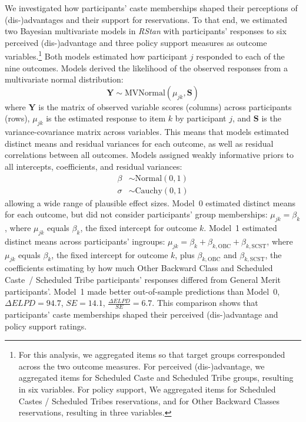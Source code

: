 \documentclass[12pt, a4paper]{article}
\begin{document}
We investigated how participants' caste memberships shaped their perceptions of (dis-)advantages and their support for reservations. To that end, we estimated two Bayesian multivariate models in \emph{RStan} \cite{rstan_package} with participants' responses to six perceived (dis-)advantage and three policy support measures as outcome variables.\footnote{For this analysis, we aggregated items so that target groups corresponded across the two outcome measures. For perceived (dis-)advantage, we aggregated items for Scheduled Caste and Scheduled Tribe groups, resulting in six variables. For policy support, We aggregated items for Scheduled Castes / Scheduled Tribes reservations, and for Other Backward Classes reservations, resulting in three variables.} Both models estimated how participant $j$ responded to each of the nine outcomes. Models derived the likelihood of the observed responses from a multivariate normal distribution: $$ \textbf{Y} \sim \text{MVNormal} (\mu_{jk}, \textbf{S} ) $$ where $\textbf{Y}$ is the matrix of observed variable scores (columns) across participants (rows), $\mu_{jk}$ is the estimated response to item $k$ by participant $j$, and $\textbf{S}$ is the variance-covariance matrix across variables. This means that models estimated distinct means and residual variances for each outcome, as well as residual correlations between all outcomes. Models assigned weakly informative priors to all intercepts, coefficients, and residual variances: 
\begin{align*} 
\beta & \sim \text{Normal} (0, 1) \\ 
\sigma & \sim \text{Cauchy} (0, 1)
\end{align*}
allowing a wide range of plausible effect sizes. Model~0 estimated distinct means for each outcome, but did not consider participants' group memberships: $ \mu_{jk} =  \beta_k $, where $\mu_{jk}$ equals $\beta_{k}$, the fixed intercept for outcome $k$. Model~1 estimated distinct means across participants' ingroups: $ \mu_{jk} =  \beta_k + \beta_{k,\text{OBC}} + \beta_{k,\text{SCST}} $, where $\mu_{jk}$ equals $\beta_k$, the fixed intercept for outcome $k$, plus $\beta_{k,\text{OBC}}$ and $\beta_{k,\text{SCST}}$, the coefficients estimating by how much Other Backward Class and Scheduled Caste~/ Scheduled Tribe participants' responses differed from General Merit participants'. Model~1 made better out-of-sample predictions than Model~0, $\Delta\textit{ELPD} = 94.7$, $SE = 14.1$, $\frac{\Delta\textit{ELPD}}{\textit{SE}} = 6.7$. This comparison shows that participants' caste memberships shaped their perceived (dis-)advantage and policy support ratings. 
\end{document}
